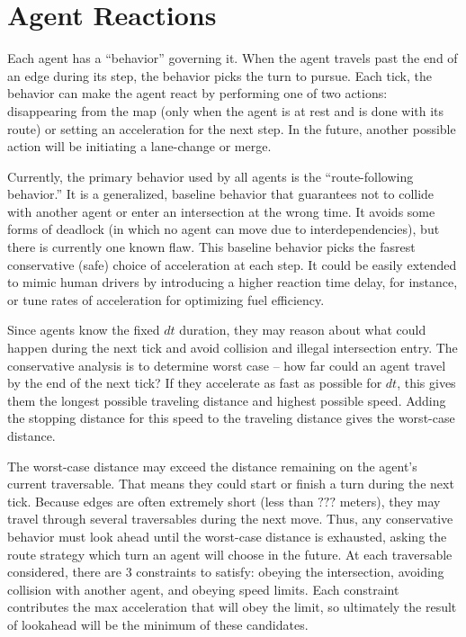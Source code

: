 \documentclass[letterpaper, 10 pt, conference]{ieeeconf}  %
\begin{document}
\section{Agent Reactions}

Each agent has a ``behavior'' governing it. When the agent travels past the end
of an edge during its step, the behavior picks the turn to pursue. Each tick,
the behavior can make the agent react by performing one of two actions:
disappearing from the map (only when the agent is at rest and is done with its
route) or setting an acceleration for the next step. In the future, another
possible action will be initiating a lane-change or merge.

Currently, the primary behavior used by all agents is the ``route-following
behavior.'' It is a generalized, baseline behavior that guarantees not to
collide with another agent or enter an intersection at the wrong time. It avoids
some forms of deadlock (in which no agent can move due to interdependencies),
but there is currently one known flaw. This baseline behavior picks the fasrest
conservative (safe) choice of acceleration at each step. It could be easily
extended to mimic human drivers by introducing a higher reaction time delay, for
instance, or tune rates of acceleration for optimizing fuel efficiency.

Since agents know the fixed $dt$ duration, they may reason about what could
happen during the next tick and avoid collision and illegal intersection entry.
The conservative analysis is to determine worst case -- how far could an agent
travel by the end of the next tick? If they accelerate as fast as possible for
$dt$, this gives them the longest possible traveling distance and highest
possible speed. Adding the stopping distance for this speed to the traveling
distance gives the worst-case distance.

The worst-case distance may exceed the distance remaining on the agent's current
traversable. That means they could start or finish a turn during the next tick.
Because edges are often extremely short (less than $???$ meters), they may
travel through several traversables during the next move. Thus, any conservative
behavior must look ahead until the worst-case distance is exhausted, asking the
route strategy which turn an agent will choose in the future. At each
traversable considered, there are 3 constraints to satisfy: obeying the
intersection, avoiding collision with another agent, and obeying speed limits.
Each constraint contributes the max acceleration that will obey the limit, so
ultimately the result of lookahead will be the minimum of these candidates.
\end{document}
